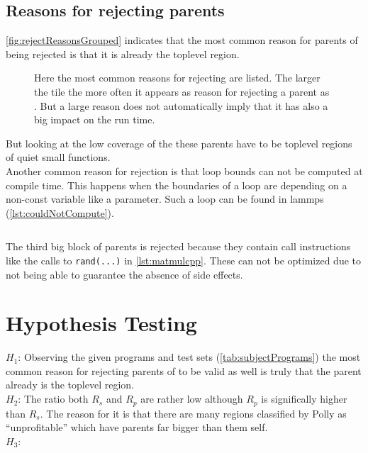 \subsection{Reasons for rejecting parents}
\autoref{fig:rejectReasonsGrouped} indicates that the most common reason for parents of \scops being rejected is that it is already the toplevel region.
\begin{figure}[!h]
    \caption[Reasons for rejecting SCoPs]{
        Here the most common reasons for rejecting are listed.
        The larger the tile the more often it appears as reason for rejecting a parent as \scop.
        But a large reason does not automatically imply that it has also a big impact on the run time.
    }
    
    \label{fig:rejectReasonsGrouped}
\end{figure}
But looking at the low coverage of the \scops these parents have to be toplevel regions of quiet small functions.\\
Another common reason for rejection is that loop bounds can not be computed at compile time.
This happens \eg when the boundaries of a loop are depending on a non-const variable like a parameter.
Such a loop can be found in lammps (\autoref{lst:couldNotCompute}).
\begin{code}
    \caption{An example for 'loop bound could not be computed'}
    \inputminted{c}{c/nonAffineLoopBoundCouldNotCompute.c}
    \label{lst:couldNotCompute}
\end{code}
The third big block of parents is rejected because they contain call instructions like the calls to \texttt{rand(...)} in \autoref{lst:matmulcpp}.
These can not be optimized due to not being able to guarantee the absence of side effects.\\

\section{Hypothesis Testing}
\(H_1\): Observing the given programs and test sets (\autoref{tab:subjectPrograms}) the most common reason for rejecting parents of \scop to be valid as well is truly that the parent already is the toplevel region.\\
\(H_2\): The ratio both \(R_s\) and \(R_p\) are rather low although \(R_p\) is significally higher than \(R_s\).
The reason for it is that there are many regions classified by Polly as \enquote{unprofitable} which have parents far bigger than them self.\\
\(H_3\): \\
